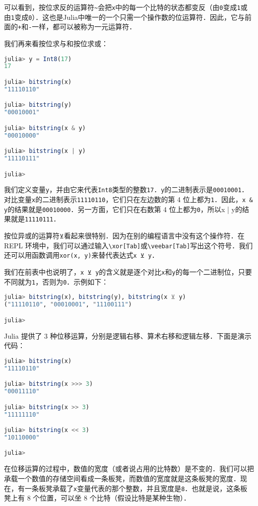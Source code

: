 可以看到，按位求反的运算符\verb|~|会把\verb|x|中的每一个比特的状态都变反（由\verb|0|变成\verb|1|或由\verb|1|变成\verb|0|）．这也是Julia中唯一的一个只需一个操作数的位运算符．因此，它与前面的\verb|+|和\verb|-|一样，都可以被称为一元运算符．

我们再来看按位求与和按位求或：
\begin{lstlisting}[language=julia]
julia> y = Int8(17)
17

julia> bitstring(x)
"11110110"

julia> bitstring(y)
"00010001"

julia> bitstring(x & y)
"00010000"

julia> bitstring(x | y)
"11110111"

julia>
\end{lstlisting}

我们定义变量\verb|y|，并由它来代表\verb|Int8|类型的整数\verb|17|．\verb|y|的二进制表示是\verb|00010001|．对比变量\verb|x|的二进制表示\verb|11110110|，它们只在左边数的第 4 位上都为\verb|1|．因此，\verb|x & y|的结果就是\verb|00010000|．另一方面，它们只在右数第 4 位上都为\verb|0|，所以x | y的结果就是\verb|11110111|．

按位异或的运算符\verb|⊻|看起来很特别．因为在别的编程语言中没有这个操作符．在 REPL 环境中，我们可以通过输入\verb|\xor[Tab]|或\verb|\veebar[Tab]|写出这个符号．我们还可以用函数调用\verb|xor(x, y)|来替代表达式\verb|x ⊻ y|．

我们在前表中也说明了，\verb|x ⊻ y|的含义就是逐个对比\verb|x|和\verb|y|的每一个二进制位，只要不同就为\verb|1|，否则为\verb|0|．示例如下：
\begin{lstlisting}[language=julia]
julia> bitstring(x), bitstring(y), bitstring(x ⊻ y)
("11110110", "00010001", "11100111")

julia> 
\end{lstlisting}

Julia 提供了 3 种位移运算，分别是逻辑右移、算术右移和逻辑左移．下面是演示代码：
\begin{lstlisting}[language=julia]
julia> bitstring(x)
"11110110"

julia> bitstring(x >>> 3)
"00011110"

julia> bitstring(x >> 3)
"11111110"

julia> bitstring(x << 3)
"10110000"

julia>
\end{lstlisting}

在位移运算的过程中，数值的宽度（或者说占用的比特数）是不变的．我们可以把承载一个数值的存储空间看成一条板凳，而数值的宽度就是这条板凳的宽度．现在，有一条板凳承载了\verb|x|变量代表的那个整数，并且宽度是\verb|8|．也就是说，这条板凳上有 8 个位置，可以坐 8 个比特（假设比特是某种生物）．

